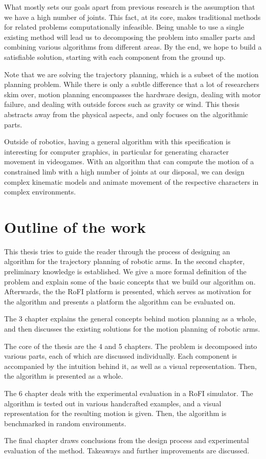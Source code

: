 What mostly sets our goals apart from previous research is the assumption that we have a high number of joints. This fact, at its core, makes traditional methods for related problems computationally infeasible.
Being unable to use a single existing method will lead us to decomposing the problem into smaller parts and combining various algorithms from different areas. By the end, we hope to build a satisfiable solution, starting with each component from the ground up.

Note that we are solving the trajectory planning, which is a subset of the motion planning problem. While there is only a subtle difference that a lot of researchers skim over, motion planning encompasses the hardware design, dealing with motor failure, and dealing with outside forces such as gravity or wind. This thesis abstracts away from the physical aspects, and only focuses on the algorithmic parts.

Outside of robotics, having a general algorithm with this specification is interesting for computer graphics, in particular for generating character movement in videogames.
With an algorithm that can compute the motion of a constrained limb with a high number of joints at our disposal, we can design complex kinematic models and animate movement of the respective characters in complex environments.

\section{Outline of the work}

This thesis tries to guide the reader through the process of designing an algorithm for the trajectory planning of robotic arms. In the second chapter, preliminary knowledge is established. We give a more formal definition of the problem and explain some of the basic concepts that we build our algorithm on. Afterwards, the the RoFI platform is presented, which serves as motivation for the algorithm and presents a platform the algorithm can be evaluated on.

The 3\rd{} chapter explains the general concepts behind motion planning as a whole, and then discusses the existing solutions for the motion planning of robotic arms.

The core of the thesis are the 4\th{} and 5\th{} chapters. The problem is decomposed into various parts, each of which are discussed individually. Each component is accompanied by the intuition behind it, as well as a visual representation. Then, the algorithm is presented as a whole.

The 6\th{} chapter deals with the experimental evaluation in a RoFI simulator. The algorithm is tested out in various handcrafted examples, and a visual representation for the resulting motion is given. Then, the algorithm is benchmarked in random environments.

The final chapter draws conclusions from the design process and experimental evaluation of the method. Takeaways and further improvements are discussed.

